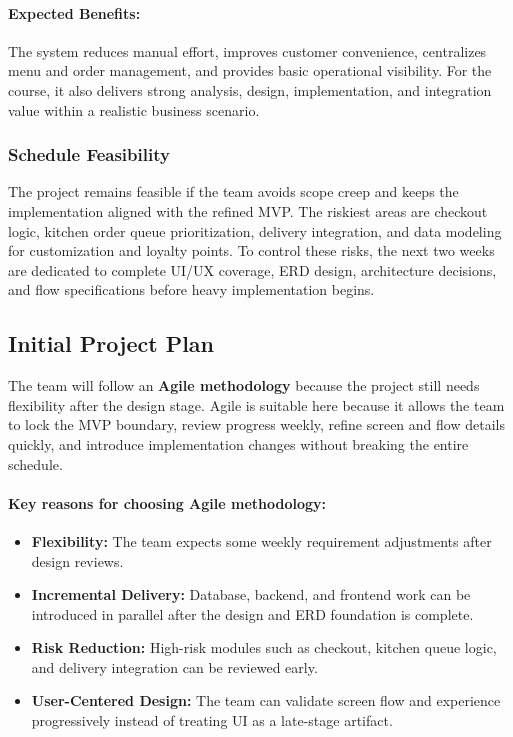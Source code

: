 \paragraph{Expected Benefits:} The system reduces manual effort, improves customer convenience, centralizes menu and order management, and provides basic operational visibility. For the course, it also delivers strong analysis, design, implementation, and integration value within a realistic business scenario.

\subsubsection{Schedule Feasibility}

The project remains feasible if the team avoids scope creep and keeps the implementation aligned with the refined MVP. The riskiest areas are checkout logic, kitchen order queue prioritization, delivery integration, and data modeling for customization and loyalty points. To control these risks, the next two weeks are dedicated to complete UI/UX coverage, ERD design, architecture decisions, and flow specifications before heavy implementation begins.

\subsection{Initial Project Plan}

The team will follow an \textbf{Agile methodology} because the project still needs flexibility after the design stage. Agile is suitable here because it allows the team to lock the MVP boundary, review progress weekly, refine screen and flow details quickly, and introduce implementation changes without breaking the entire schedule.

\paragraph{Key reasons for choosing Agile methodology:}
\begin{itemize}
    \item \textbf{Flexibility:} The team expects some weekly requirement adjustments after design reviews.
    \item \textbf{Incremental Delivery:} Database, backend, and frontend work can be introduced in parallel after the design and ERD foundation is complete.
    \item \textbf{Risk Reduction:} High-risk modules such as checkout, kitchen queue logic, and delivery integration can be reviewed early.
    \item \textbf{User-Centered Design:} The team can validate screen flow and experience progressively instead of treating UI as a late-stage artifact.
\end{itemize}

